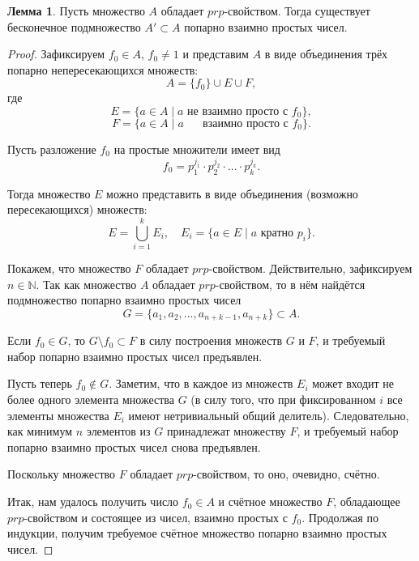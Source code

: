 \documentclass[a4paper,openbib]{article}
\theoremstyle{definition}
\newtheorem{lemma}{Лемма}[section]
\begin{document}
\begin{lemma}
	\label{lem:ac0_primes_infinity_mutually_prime_subset_equiv_to_prp_property}
	Пусть множество $A$ обладает $prp$-свойством.
	Тогда существует бесконечное подмножество $A'\subset A$ попарно взаимно простых чисел.
\end{lemma}
\begin{proof}
	Зафиксируем $f_0\in A$, $f_0 \neq 1$ и представим $A$ в виде объединения трёх попарно непересекающихся множеств:
	\begin{equation}
		A = \{f_0\} \cup E \cup F
		,
	\end{equation}
	где
	\begin{equation}
		E = \{ a \in A \mid a \mbox{~не взаимно просто с~} f_0 \}
		,
	\end{equation}
	\begin{equation}
		F = \{ a \in A \mid a \mbox{ ~~~~взаимно просто с~} f_0 \}
		.
	\end{equation}

	Пусть разложение $f_0$ на простые множители имеет вид
	\begin{equation}
		f_0 = p_1^{j_1} \cdot p_2^{j_2} \cdot ... \cdot p_k^{j_k}
		.
	\end{equation}

	Тогда множество $E$ можно представить в виде объединения (возможно пересекающихся) множеств:
	\begin{equation}
		E = \bigcup_{i=1}^{k} E_i,\quad E_i = \{a\in E \mid a \mbox{~кратно~} p_i\}
		.
	\end{equation}

	Покажем, что множество $F$ обладает $prp$-свойством.
	Действительно, зафиксируем $n\in\mathbb{N}$.
	Так как множество $A$ обладает $prp$-свойством,
	то в нём найдётся подмножество попарно взаимно простых чисел
	$$G=\{a_1, a_2, ..., a_{n+k-1}, a_{n+k}\}\subset A.$$

	Если $f_0\in G$, то $G\setminus f_0 \subset F$ в силу построения множеств $G$ и $F$, и требуемый набор попарно взаимно простых чисел предъявлен.

	Пусть теперь $f_0\notin G$.
	Заметим, что в каждое из множеств $E_i$ может входит не более одного элемента множества $G$
	(в силу того, что при фиксированном $i$ все элементы множества $E_i$ имеют нетривиальный общий делитель).
	Следовательно, как минимум $n$ элементов из $G$ принадлежат множеству $F$,
	и требуемый набор попарно взаимно простых чисел снова предъявлен.

	Поскольку множество $F$ обладает $prp$-свойством, то оно, очевидно, счётно.

	Итак, нам удалось получить число $f_0\in A$ и счётное множество $F$, обладающее $prp$-свойством
	и состоящее из чисел, взаимно простых с $f_0$.
	Продолжая по индукции, получим требуемое счётное множество попарно взаимно простых чисел.
\end{proof}
\end{document}
